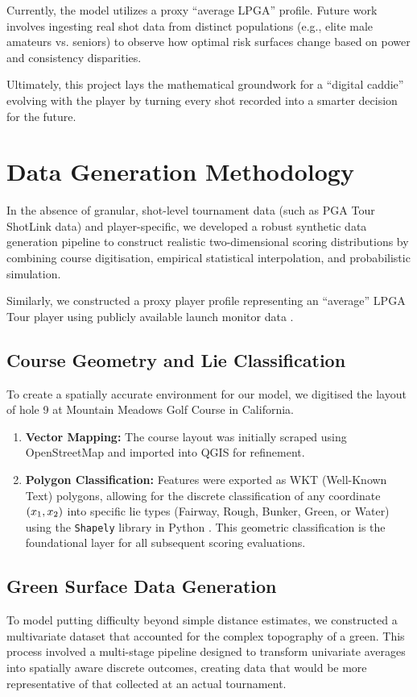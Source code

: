 \documentclass[11pt, letterpaper]{article}
\begin{document}
Currently, the model utilizes a proxy ``average LPGA'' profile. Future work involves ingesting real shot data from distinct populations (e.g., elite male amateurs vs. seniors) to observe how optimal risk surfaces change based on power and consistency disparities.

Ultimately, this project lays the mathematical groundwork for a ``digital caddie'' evolving with the player by turning every shot recorded into a smarter decision for the future.

\appendix
\section{Data Generation Methodology}
\label{sec:Appendix}
In the absence of granular, shot-level tournament data (such as PGA Tour ShotLink data) and player-specific, we developed a robust synthetic data generation pipeline to construct realistic two-dimensional scoring distributions by combining course digitisation, empirical statistical interpolation, and probabilistic simulation.

Similarly, we constructed a proxy player profile representing an ``average'' LPGA Tour player using publicly available launch monitor data \parencite{trackman2024averages}.

\subsection{Course Geometry and Lie Classification}
\label{app: course-representation}

To create a spatially accurate environment for our model, we digitised the layout of hole 9 at Mountain Meadows Golf Course in California.
\begin{enumerate}
    \item \textbf{Vector Mapping:} The course layout was initially scraped using OpenStreetMap \parencite{openstreetmap} and imported into QGIS \parencite{qgis} for refinement.
    \item \textbf{Polygon Classification:} Features were exported as WKT (Well-Known Text) polygons, allowing for the discrete classification of any coordinate $(x_1, x_2)$ into specific lie types (Fairway, Rough, Bunker, Green, or Water) using the \texttt{Shapely} library in Python \parencite{shapely}. This geometric classification is the foundational layer for all subsequent scoring evaluations.
\end{enumerate}

\subsection{Green Surface Data Generation}
\label{app: green-surface data}
To model putting difficulty beyond simple distance estimates, we constructed a multivariate dataset that accounted for the complex topography of a green. This process involved a multi-stage pipeline designed to transform univariate averages into spatially aware discrete outcomes, creating data that would be more representative of that collected at an actual tournament.
\end{document}
